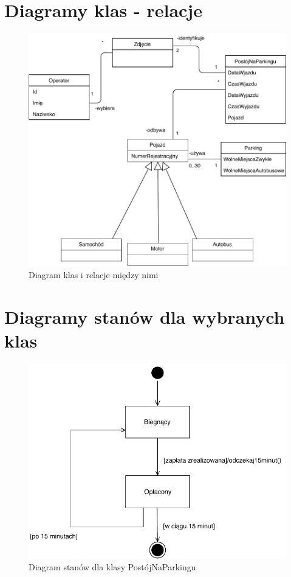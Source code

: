 \section{Diagramy klas  - relacje}
\label{sec:diagKlas}
\begin{figure}[H]
	\centering
	\includegraphics[width=150mm]{diagramy/DiagKlas.pdf}
	\caption{Diagram klas i relacje między nimi}
\end{figure}



\section{Diagramy stanów dla wybranych klas}
\label{sec:diagStanow}
\begin{figure}[H]
	\centering
	\includegraphics[width=130mm]{diagramy/DiagStanow.pdf}
	\caption{Diagram stanów dla klasy PostójNaParkingu}
\end{figure}



